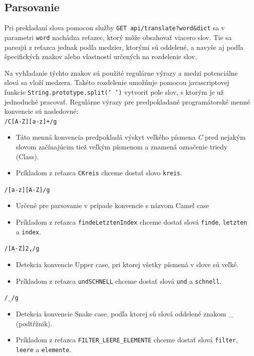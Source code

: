 \documentclass[
  digital, %
  table,   %
  lof,     %
  lot,     %
]{fithesis3}
\begin{document}
\subsection{Parsovanie}
Pri prekladaní slova pomocou služby \texttt{GET api/translate?word\&dict} sa v parametri \texttt{word} nachádza reťazec, ktorý môže obsahovať viacero slov. Tie sa parsujú z reťazca jednak podľa medzier, ktorými sú oddelené, a navyše aj podľa špecifických znakov alebo vlastností určených na rozdelenie slov.

Na vyhľadanie týchto znakov sú použité regulárne výrazy a medzi potenciálne slová sa vloží medzera. Takéto rozdelenie umožňuje pomocou javascriptovej funkcie \texttt{String.prototype.split(' ')} vytvoriť pole slov, s ktorým je už jednoduché pracovať. Regulárne výrazy pre predpokladané programátorské menné konvencie sú nasledovné:
\\

\noindent
\texttt{/C[A-Z][a-z]+/g}
\begin{itemize}
\item Táto menná konvencia predpokladá výskyt veľkého písmena \textit{C} pred nejakým slovom začínajúcim tiež veľkým písmenom a znamená označenie triedy (Class).
\item Príkladom z reťazca \texttt{CKreis} chceme dostať slovo \texttt{kreis}.
\end{itemize}

\noindent
\texttt{/[a-z][A-Z]/g}
\begin{itemize}
\item Určené pre parsovanie v prípade konvencie s názvom Camel case
\item Príkladom z reťazca \texttt{findeLetztenIndex} chceme dostať slová \texttt{finde}, \texttt{letzten} a \texttt{index}.
\end{itemize}

\noindent
\texttt{/[A-Z]{2,}/g}
\begin{itemize}
\item Detekcia konvencie Upper case, pri ktorej všetky písmená v slove sú veľké.
\item Príkladom z reťazca \texttt{undSCHNELL} chceme dostať slová \texttt{und} a \texttt{schnell}.
\end{itemize}

\noindent
\texttt{/\_/g}
\begin{itemize}
\item Detekcia konvencie Snake case, podľa ktorej sú slová oddelené znakom \_ (podtŕžnik).
\item Príkladom z reťazca \texttt{FILTER\_LEERE\_ELEMENTE} chceme dostať slová \texttt{filter}, \texttt{leere} a \texttt{elemente}.
\end{itemize}
\end{document}
